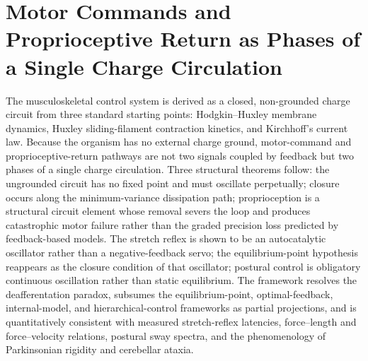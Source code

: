 
\providecommand{\Vm}{V_{\mathrm{m}}}
\providecommand{\Cm}{C_{\mathrm{m}}}
\providecommand{\Iion}{I_{\mathrm{ion}}}
\providecommand{\Ie}{I_{\mathrm{e}}}
\providecommand{\Isyn}{I_{\mathrm{syn}}}
\providecommand{\gsyn}{g_{\mathrm{syn}}}
\providecommand{\Esyn}{E_{\mathrm{syn}}}
\providecommand{\tausr}{\tau_{\mathrm{sr}}}
\providecommand{\taumu}{\tau_{\mu}}
\providecommand{\Fzero}{F_{0}}
\providecommand{\lambdaEP}{\lambda}

\chapter{Motor Commands and Proprioceptive Return as Phases of a Single Charge Circulation}
\label{ch:musculoskeletal}


\begin{chapterabstract}
The musculoskeletal control system is derived as a closed, non-grounded charge
circuit from three standard starting points: Hodgkin--Huxley membrane dynamics,
Huxley sliding-filament contraction kinetics, and Kirchhoff's current law.
Because the organism has no external charge ground, motor-command and
proprioceptive-return pathways are not two signals coupled by feedback but two
phases of a single charge circulation. Three structural theorems follow: the
ungrounded circuit has no fixed point and must oscillate perpetually; closure
occurs along the minimum-variance dissipation path; proprioception is a
structural circuit element whose removal severs the loop and produces
catastrophic motor failure rather than the graded precision loss predicted by
feedback-based models. The stretch reflex is shown to be an autocatalytic
oscillator rather than a negative-feedback servo; the equilibrium-point
hypothesis reappears as the closure condition of that oscillator; postural
control is obligatory continuous oscillation rather than static equilibrium.
The framework resolves the deafferentation paradox, subsumes the
equilibrium-point, optimal-feedback, internal-model, and hierarchical-control
frameworks as partial projections, and is quantitatively consistent with
measured stretch-reflex latencies, force--length and force--velocity relations,
postural sway spectra, and the phenomenology of Parkinsonian rigidity and
cerebellar ataxia.
\end{chapterabstract}

